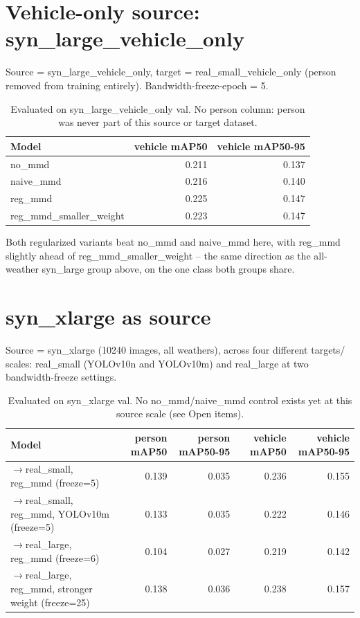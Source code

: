 \documentclass[11pt]{article}
\begin{document}
\section{Vehicle-only source: syn\_large\_vehicle\_only}

Source = syn\_large\_vehicle\_only, target = real\_small\_vehicle\_only (person
removed from training entirely). Bandwidth-freeze-epoch = 5.

\begin{table}[h!]
    \centering
    \begin{tabular}{lrr}
        \toprule
        Model & vehicle mAP50 & vehicle mAP50-95 \\
        \midrule
        no\_mmd                  & 0.211 & 0.137 \\
        naive\_mmd               & 0.216 & 0.140 \\
        reg\_mmd                 & 0.225 & 0.147 \\
        reg\_mmd\_smaller\_weight & 0.223 & 0.147 \\
        \bottomrule
    \end{tabular}
    \caption{Evaluated on syn\_large\_vehicle\_only val. No person column: person was
    never part of this source or target dataset.}
\end{table}

\noindent Both regularized variants beat no\_mmd and naive\_mmd here, with reg\_mmd
slightly ahead of reg\_mmd\_smaller\_weight -- the same direction as the all-weather
syn\_large group above, on the one class both groups share.

\section{syn\_xlarge as source}

Source = syn\_xlarge (10240 images, all weathers), across four different targets/
scales: real\_small (YOLOv10n and YOLOv10m) and real\_large at two bandwidth-freeze
settings.

\begin{table}[h!]
    \centering
    \small
    \begin{tabular}{lrrrr}
        \toprule
        Model & person mAP50 & person mAP50-95 & vehicle mAP50 & vehicle mAP50-95 \\
        \midrule
        $\to$real\_small, reg\_mmd (freeze=5)                     & 0.139 & 0.035 & 0.236 & 0.155 \\
        $\to$real\_small, reg\_mmd, YOLOv10m (freeze=5)           & 0.133 & 0.035 & 0.222 & 0.146 \\
        $\to$real\_large, reg\_mmd (freeze=6)                     & 0.104 & 0.027 & 0.219 & 0.142 \\
        $\to$real\_large, reg\_mmd, stronger weight (freeze=25)   & 0.138 & 0.036 & 0.238 & 0.157 \\
        \bottomrule
    \end{tabular}
    \caption{Evaluated on syn\_xlarge val. No no\_mmd/naive\_mmd control exists yet
    at this source scale (see Open items).}
\end{table}
\end{document}
